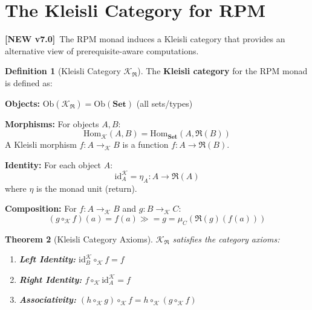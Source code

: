 \documentclass[11pt,twoside,openright]{book}
\theoremstyle{definition}
\newtheorem{definition}{Definition}[chapter]
\theoremstyle{plain}
\newtheorem{theorem}[definition]{Theorem}
\theoremstyle{remark}
\newcommand{\RPM}{\mathfrak{R}}
\newcommand{\rpmbind}{\mathbin{\gg\!=}}
\newcommand{\Ob}{\mathrm{Ob}}
\newcommand{\Hom}{\mathrm{Hom}}
\newcommand{\id}{\mathrm{id}}
\newcommand{\Kleisli}{\mathcal{K}}
\newcommand{\vnew}{\textcolor{blue!70!black}{\textbf{[NEW v7.0]}}}
\begin{document}

\section{The Kleisli Category for RPM}
\label{sec:rpm-kleisli}

\vnew\ The RPM monad induces a Kleisli category that provides an alternative view of prerequisite-aware computations.

\begin{definition}[Kleisli Category $\Kleisli_\RPM$]
\label{def:kleisli-rpm}
The \textbf{Kleisli category} for the RPM monad is defined as:

\textbf{Objects:} $\Ob(\Kleisli_\RPM) = \Ob(\mathbf{Set})$ (all sets/types)

\textbf{Morphisms:} For objects $A, B$:
\[
\Hom_{\Kleisli}(A, B) = \Hom_{\mathbf{Set}}(A, \RPM(B))
\]
A Kleisli morphism $f : A \to_\Kleisli B$ is a function $f : A \to \RPM(B)$.

\textbf{Identity:} For each object $A$:
\[
\id_A^\Kleisli = \eta_A : A \to \RPM(A)
\]
where $\eta$ is the monad unit (return).

\textbf{Composition:} For $f : A \to_\Kleisli B$ and $g : B \to_\Kleisli C$:
\[
(g \circ_\Kleisli f)(a) = f(a) \rpmbind g = \mu_C(\RPM(g)(f(a)))
\]
\end{definition}

\begin{theorem}[Kleisli Category Axioms]
\label{thm:kleisli-axioms}
$\Kleisli_\RPM$ satisfies the category axioms:
\begin{enumerate}
  \item \textbf{Left Identity:} $\id_B^\Kleisli \circ_\Kleisli f = f$
  \item \textbf{Right Identity:} $f \circ_\Kleisli \id_A^\Kleisli = f$
  \item \textbf{Associativity:} $(h \circ_\Kleisli g) \circ_\Kleisli f = h \circ_\Kleisli (g \circ_\Kleisli f)$
\end{enumerate}
\end{theorem}
\end{document}
